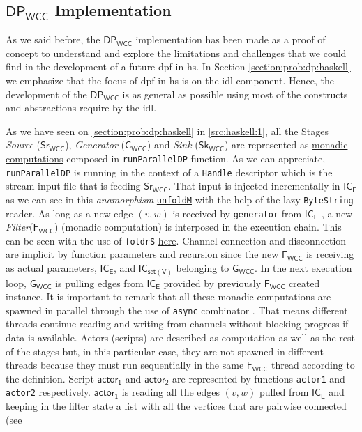 \documentclass[preprint]{elsarticle}
\newcommand{\dpwcc}{\mathsf{DP_{WCC}}}
\newcommand{\iwc}{\mathsf{Sr_{WCC}}}
\newcommand{\owc}{\mathsf{Sk_{WCC}}}
\newcommand{\fwc}{\mathsf{F_{WCC}}}
\newcommand{\gwc}{\mathsf{G_{WCC}}}
\newcommand{\ice}{\mathsf{IC_E}}
\newcommand{\csofv}{\mathsf{IC_{set(V)}}}
\newcommand{\Act}{\mathsf{actor_1}}
\newcommand{\Actt}{\mathsf{actor_2}}
\begin{document}
\subsection{$\dpwcc$ Implementation}
%
As we said before, the  $\dpwcc$ implementation has been made as a proof of concept to understand and explore the limitations and challenges that we could find in the development of a future  \acrshort{dpf} in \acrshort{hs}. In Section \ref{section:prob:dp:haskell} we emphasize that the focus of \acrshort{dpf} in \acrshort{hs} is on the \acrshort{idl} component. Hence, the development of the $\dpwcc$ is as general as possible using most of the constructs and abstractions require by the  \acrshort{idl}.


As we have seen on \autoref{section:prob:dp:haskell} in \autoref{src:haskell:1}, all the Stages \textit{Source} ($\iwc$),  \textit{Generator} ($\gwc$) and \textit{Sink} ($\owc$) are represented as \href{https://github.com/jproyo/upc-miri-tfm/blob/17ee929f64a8be8a88ced782bfcf6bf355d8580a/connected-comp/src/ConnComp/Internal.hs#L20-L27}{monadic computations} composed in \texttt{runParallelDP} function. As we can appreciate, \texttt{runParallelDP} is running in the context of a \texttt{Handle} descriptor which is the stream input file that is feeding $\iwc$. That input is injected incrementally in $\ice$ as we can see in this \emph{anamorphism} \href{https://github.com/jproyo/upc-miri-tfm/blob/17ee929f64a8be8a88ced782bfcf6bf355d8580a/connected-comp/src/ConnComp/Internal.hs#L84-L85}{\texttt{unfoldM}} with the help of the lazy \texttt{ByteString} reader. As long as a new edge $(v,w)$ is received by \texttt{generator}  from $\ice$ , a new \textit{Filter}($\fwc$) (monadic computation) is interposed in the execution chain. This can be seen with the use of \texttt{foldrS}  \href{https://github.com/jproyo/upc-miri-tfm/blob/17ee929f64a8be8a88ced782bfcf6bf355d8580a/connected-comp/src/ConnComp/Internal.hs#L35-L41}{here}. Channel connection and disconnection are implicit by function parameters and recursion since the new $\fwc$ is receiving as actual parameters, $\ice$, and $\csofv$ belonging to $\gwc$. In the next execution loop, $\gwc$ is pulling edges from $\ice$ provided by previously $\fwc$ created instance. It is important to remark that all these monadic computations are spawned in parallel through the use of \texttt{async} combinator \cite{async}. That means different threads continue reading and writing from channels without blocking progress if data is available. Actors (scripts) are described as computation as well as the rest of the stages but, in this particular case, they are not spawned in different threads because they must run sequentially in the same $\fwc$ thread according to the definition. Script $\Act$ and $\Actt$ are represented by functions \texttt{actor1} and \texttt{actor2} respectively. $\Act$ is reading all the edges $(v,w)$ pulled from $\ice$ and keeping in the filter state a list with all the vertices that are pairwise connected (see 
\end{document}
